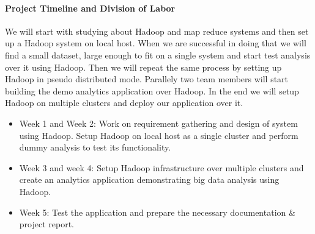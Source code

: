 \paragraph{Project Timeline and Division of Labor}

We will start with studying about Hadoop and map reduce systems and then  set
up a Hadoop system on local host. When we are successful in doing that we will
find a small dataset, large enough to fit on a single system and start test
analysis over it using Hadoop. Then we will repeat the same process by setting
up Hadoop in pseudo distributed mode. Parallely two team members will start
building the demo analytics application over Hadoop. In the end we will setup
Hadoop on multiple clusters and deploy our application over it.

\begin{itemize}
  \item Week 1 and Week 2: Work on requirement gathering and design of system
    using Hadoop. Setup Hadoop on local host as a single cluster and perform
    dummy analysis to test its functionality.
  \item Week 3 and week 4: Setup Hadoop infrastructure over multiple clusters
    and create an analytics application demonstrating big data analysis using
    Hadoop.
  \item Week 5: Test the application and prepare the necessary documentation \&
    project report.
\end{itemize}
